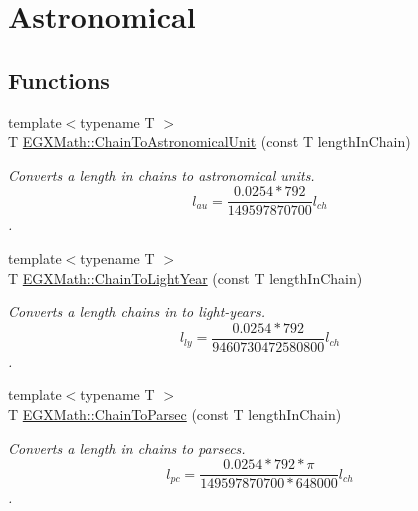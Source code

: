\hypertarget{group___e_g_x_math-_conversions-_length_conversions-_imperial-_chain-_astronomical}{}\section{Astronomical}
\label{group___e_g_x_math-_conversions-_length_conversions-_imperial-_chain-_astronomical}
\subsection*{Functions}
\begin{DoxyCompactItemize}
\item 
{\footnotesize template$<$typename T $>$ }\\T \mbox{\hyperlink{group___e_g_x_math-_conversions-_length_conversions-_imperial-_chain-_astronomical_ga5fd3b01f376172581a8847b593d33466}{E\+G\+X\+Math\+::\+Chain\+To\+Astronomical\+Unit}} (const T length\+In\+Chain)
\begin{DoxyCompactList}\small\item\em Converts a length in chains to astronomical units. \[ l_{au}=\frac{0.0254 * 792}{149597870700} l_{ch} \]. \end{DoxyCompactList}\item 
{\footnotesize template$<$typename T $>$ }\\T \mbox{\hyperlink{group___e_g_x_math-_conversions-_length_conversions-_imperial-_chain-_astronomical_ga0414df8660b7f8fd74f32b0d88c3476f}{E\+G\+X\+Math\+::\+Chain\+To\+Light\+Year}} (const T length\+In\+Chain)
\begin{DoxyCompactList}\small\item\em Converts a length chains in to light-\/years. \[ l_{ly}=\frac{0.0254 * 792}{9460730472580800} l_{ch} \]. \end{DoxyCompactList}\item 
{\footnotesize template$<$typename T $>$ }\\T \mbox{\hyperlink{group___e_g_x_math-_conversions-_length_conversions-_imperial-_chain-_astronomical_gad5475701b576e1f8609e04610024dda2}{E\+G\+X\+Math\+::\+Chain\+To\+Parsec}} (const T length\+In\+Chain)
\begin{DoxyCompactList}\small\item\em Converts a length in chains to parsecs. \[ l_{pc}=\frac{0.0254 * 792 * \pi}{149597870700 * 648000} l_{ch} \]. \end{DoxyCompactList}\end{DoxyCompactItemize}


